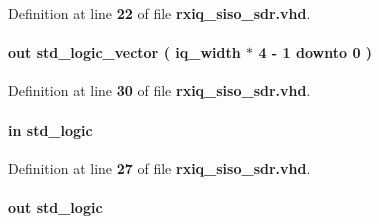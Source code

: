 Definition at line {\bf 22} of file {\bf rxiq\+\_\+siso\+\_\+sdr.\+vhd}.

\paragraph[{fifo\+\_\+wdata}]{ {\bfseries \textcolor{keywordflow}{out}\textcolor{vhdlchar}{ }} {\bfseries \textcolor{comment}{std\+\_\+logic\+\_\+vector}\textcolor{vhdlchar}{ }\textcolor{vhdlchar}{(}\textcolor{vhdlchar}{ }\textcolor{vhdlchar}{ }\textcolor{vhdlchar}{ }\textcolor{vhdlchar}{ }{\bfseries {\bf iq\+\_\+width}} \textcolor{vhdlchar}{$\ast$}\textcolor{vhdlchar}{ } \textcolor{vhdldigit}{4} \textcolor{vhdlchar}{-\/}\textcolor{vhdlchar}{ } \textcolor{vhdldigit}{1} \textcolor{vhdlchar}{ }\textcolor{keywordflow}{downto}\textcolor{vhdlchar}{ }\textcolor{vhdlchar}{ } \textcolor{vhdldigit}{0} \textcolor{vhdlchar}{ }\textcolor{vhdlchar}{)}\textcolor{vhdlchar}{ }} \hspace{0.3cm}{\ttfamily [Port]}}\label{classrxiq__siso__sdr_a880b1371c4c1600fe490c979402d668f}


Definition at line {\bf 30} of file {\bf rxiq\+\_\+siso\+\_\+sdr.\+vhd}.

\paragraph[{fifo\+\_\+wfull}]{ {\bfseries \textcolor{keywordflow}{in}\textcolor{vhdlchar}{ }} {\bfseries \textcolor{comment}{std\+\_\+logic}\textcolor{vhdlchar}{ }} \hspace{0.3cm}{\ttfamily [Port]}}\label{classrxiq__siso__sdr_a63de1b8160d1ffec718f19920aa9a2a1}


Definition at line {\bf 27} of file {\bf rxiq\+\_\+siso\+\_\+sdr.\+vhd}.

\paragraph[{fifo\+\_\+wrreq}]{ {\bfseries \textcolor{keywordflow}{out}\textcolor{vhdlchar}{ }} {\bfseries \textcolor{comment}{std\+\_\+logic}\textcolor{vhdlchar}{ }} \hspace{0.3cm}{\ttfamily [Port]}}\label{classrxiq__siso__sdr_a4643410c72f0390bde3d442228a1dfd2}


